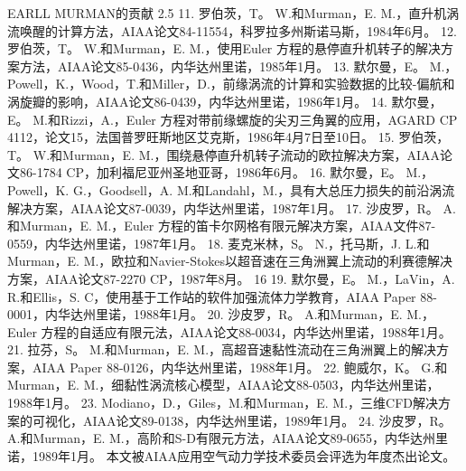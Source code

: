 \documentclass[UTF8,11pt,a4paper,openany,fontset=fandol]{ctexbook}
\begin{document}
EARLL MURMAN的贡献 2.5 11. 罗伯茨，T。 W.和Murman，E. M.，直升机涡流唤醒的计算方法，AIAA论文84-11554，科罗拉多州斯诺马斯，1984年6月。 12. 罗伯茨，T。 W.和Murman，E. M.，使用Euler 方程的悬停直升机转子的解决方案方法，AIAA论文85-0436，内华达州里诺，1985年1月。 13. 默尔曼，E。 M.，Powell，K.，Wood，T.和Miller，D.，前缘涡流的计算和实验数据的比较-偏航和涡旋瓣的影响，AIAA论文86-0439，内华达州里诺，1986年1月。 14. 默尔曼，E。 M.和Rizzi，A.，Euler 方程对带前缘螺旋的尖刃三角翼的应用，AGARD CP 4112，论文15，法国普罗旺斯地区艾克斯，1986年4月7日至10日。 15. 罗伯茨，T。 W.和Murman，E. M.，围绕悬停直升机转子流动的欧拉解决方案，AIAA论文86-1784 CP，加利福尼亚州圣地亚哥，1986年6月。 16. 默尔曼，E。 M.，Powell，K. G.，Goodsell，A. M.和Landahl，M.，具有大总压力损失的前沿涡流解决方案，AIAA论文87-0039，内华达州里诺，1987年1月。 17. 沙皮罗，R。 A.和Murman，E. M.，Euler 方程的笛卡尔网格有限元解决方案，AIAA文件87-0559，内华达州里诺，1987年1月。 18. 麦克米林，S。 N.，托马斯，J. L.和Murman，E. M.，欧拉和Navier-Stokes以超音速在三角洲翼上流动的利赛德解决方案，AIAA论文87-2270 CP，1987年8月。 16 19. 默尔曼，E。 M.，LaVin，A. R.和Ellis，S. C，使用基于工作站的软件加强流体力学教育，AIAA Paper 88-0001，内华达州里诺，1988年1月。 20. 沙皮罗，R。 A.和Murman，E. M.，Euler 方程的自适应有限元法，AIAA论文88-0034，内华达州里诺，1988年1月。 21. 拉芬，S。 M.和Murman，E. M.，高超音速黏性流动在三角洲翼上的解决方案，AIAA Paper 88-0126，内华达州里诺，1988年1月。 22. 鲍威尔，K。 G.和Murman，E. M.，细黏性涡流核心模型，AIAA论文88-0503，内华达州里诺，1988年1月。 23. Modiano，D.，Giles，M.和Murman，E. M.，三维CFD解决方案的可视化，AIAA论文89-0138，内华达州里诺，1989年1月。 24. 沙皮罗，R。 A.和Murman，E. M.，高阶和S-D有限元方法，AIAA论文89-0655，内华达州里诺，1989年1月。 本文被AIAA应用空气动力学技术委员会评选为年度杰出论文。
\end{document}

